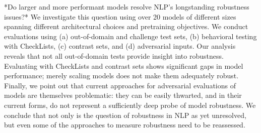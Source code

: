 *Do larger and more performant models resolve NLP's longstanding robustness issues?* We investigate this question using over 20 models of different sizes spanning different architectural choices and pretraining objectives. We conduct evaluations using (a)  out-of-domain and challenge test sets, (b) behavioral testing with CheckLists, (c) contrast sets, and (d) adversarial inputs.  Our analysis reveals that not all out-of-domain tests provide insight into robustness. Evaluating with CheckLists and contrast sets shows significant gaps in model performance; merely scaling models does not make them adequately robust. Finally, we point out that current approaches for adversarial evaluations of models are themselves problematic: they can be easily thwarted, and in their current forms, do not represent a sufficiently deep probe of model robustness. We conclude that not only is the question of robustness in NLP as yet unresolved, but even some of the approaches to measure robustness need to be reassessed.